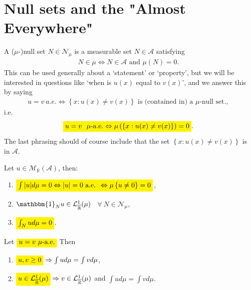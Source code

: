 \section{Null sets and the "Almost Everywhere"}
\begin{definition}
    A (\(\mu\)-)null set \(N\in\mathcal{N}_{\mu}\) is a measurable set \(N\in\mathscr{A}\) satisfying
    \begin{align}
        N\in\mathcal{\mu} \Leftrightarrow N\in\mathscr{A} \text{ and } \mu(N) = 0.
    \end{align}
    This can be used generally about a `statement' or `property', but we will be interested in questions like 
    `when is \(u(x)\) equal to \(v(x)\)', and we answer this by saying
    \begin{align}
        u=v \ a.e. \Leftrightarrow \left\{ x: u(x) \neq v(x) \right\} \text{ is (contained in) a }\mu\text{-null set.}, 
    \end{align}
    i.e.
    \begin{align}
        \highlight[yellow]{u=v \ \  \mu\text{-a.e.} \Leftrightarrow \mu\left( \left\{ x: u(x) \neq v(x) \right\} \right) = 0}.
    \end{align}
    The last phrasing should of course include that the set \( \left\{ x: u(x) \neq v(x) \right\}\) is in \(\mathscr{A}\).
\end{definition}
\begin{theorem}
    Let \(u\in \mathcal{M}_{\overline{\mathbb{R}}}(\mathscr{A})\), then:
    \begin{enumerate}[label=(\roman*)]
        \item \(\highlight[yellow]{\int\vert u\vert d\mu = 0 \Leftrightarrow \vert u\vert = 0 \text{ a.e. } \Leftrightarrow \mu\left\{u\neq0\right\} = 0}\),
        \item \(\mathbbm{1}_{N}u\in \mathcal{L}^{1}_{\overline{\mathbb{R}}}(\mu)\) \ \(\forall \ N\in\mathcal{N}_{\mu}\),
        \item \(\highlight[yellow]{\int_Nud\mu = 0}\).
    \end{enumerate}
\end{theorem}
\begin{corollary}
    Let \(\highlight[yellow]{u=v \ \mu \text{-a.e.}}\) Then
    \begin{enumerate}[label=(\roman*)]
        \item \(\highlight[yellow]{u,v \geq 0} \Rightarrow \int ud\mu = \int vd\mu\),
        \item \(\highlight[yellow]{u\in\mathcal{L}^{1}_{\overline{\mathbb{R}}}(\mu)} \Rightarrow v\in\mathcal{L}^{1}_{\overline{\mathbb{R}}}(\mu)\) and \(\int ud\mu = \int vd\mu\).
    \end{enumerate}
\end{corollary}
